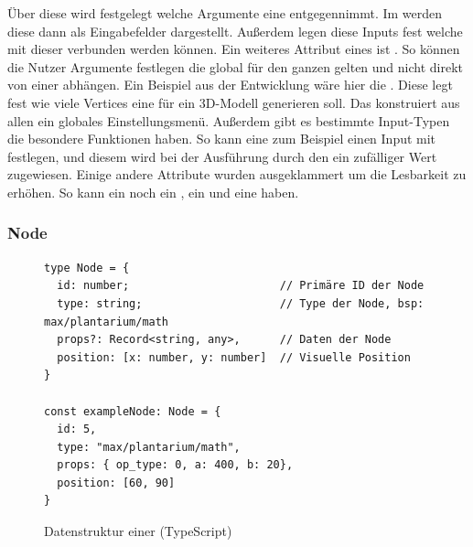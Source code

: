 \documentclass[ngerman]{article}
\begin{document}
Über diese  wird festgelegt welche Argumente eine  entgegennimmt.
Im  werden diese dann als Eingabefelder dargestellt. Außerdem legen diese Inputs fest welche  mit dieser  verbunden werden können. 
\br
Ein weiteres Attribut eines  ist . So können die Nutzer Argumente festlegen die global für den ganzen  gelten und nicht direkt von einer  abhängen. Ein Beispiel aus der Entwicklung wäre hier die . Diese legt fest wie viele Vertices eine  für ein 3D-Modell generieren soll. Das  konstruiert aus allen  ein globales Einstellungsmenü.
\br
Außerdem gibt es bestimmte Input-Typen die besondere Funktionen haben. So kann eine  zum Beispiel einen Input mit  festlegen, und diesem wird bei der Ausführung durch den  ein zufälliger Wert zugewiesen.
\br
Einige andere Attribute wurden ausgeklammert um die Lesbarkeit zu erhöhen. So kann ein  noch ein , ein  und eine  haben.

\subsubsection*{Node}

\begin{figure}[htbp]
  \begin{code}
    \begin{verbatim}
type Node = {
  id: number;                       // Primäre ID der Node
  type: string;                     // Type der Node, bsp: max/plantarium/math
  props?: Record<string, any>,      // Daten der Node
  position: [x: number, y: number]  // Visuelle Position
}

const exampleNode: Node = {
  id: 5,
  type: "max/plantarium/math",
  props: { op_type: 0, a: 400, b: 20},
  position: [60, 90]
}

    \end{verbatim}
  \end{code}

  \caption{Datenstruktur einer  (TypeScript)}
  \label{fig:data_node}

\end{figure}
\end{document}
